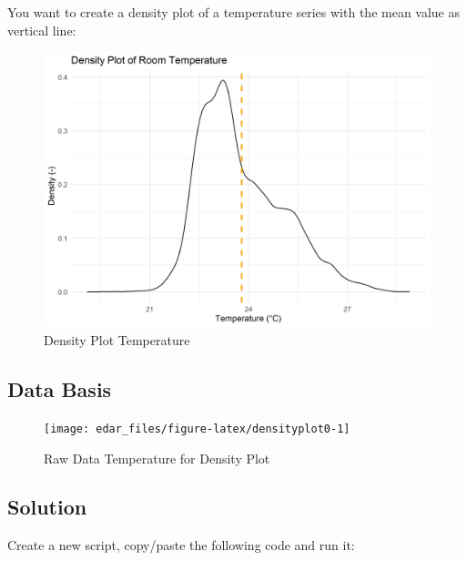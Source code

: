 \documentclass[
  a4paperpaper,
]{book}
\begin{document}
You want to create a density plot of a temperature series with the mean value as vertical line:

\begin{figure}
\includegraphics[width=0.7\linewidth]{images/plotDensity} \caption{Density Plot Temperature}\label{fig:unnamed-chunk-12}
\end{figure}

\hypertarget{data-basis-2}{%
\subsection{Data Basis}\label{data-basis-2}}

\begin{figure}
\texttt{[image: edar\_files/figure-latex/densityplot0-1]} \caption{Raw Data Temperature for Density Plot}\label{fig:densityplot0}
\end{figure}
\newpage

\hypertarget{solution-2}{%
\subsection{Solution}\label{solution-2}}

Create a new script, copy/paste the following code and run it:
\end{document}
